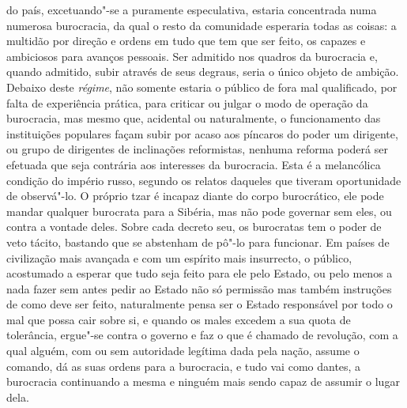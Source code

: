 do país, excetuando"-se a puramente especulativa, estaria concentrada
numa numerosa burocracia, da qual o resto da comunidade esperaria todas
as coisas: a multidão por direção e ordens em tudo que tem que ser
feito, os capazes e ambiciosos para avanços pessoais. Ser admitido nos
quadros da burocracia e, quando admitido, subir através de seus
degraus, seria o único objeto de ambição. Debaixo deste
\textit{régime}, não somente estaria o público de fora mal qualificado,
por falta de experiência prática, para criticar ou julgar o modo de
operação da burocracia, mas mesmo que, acidental ou naturalmente, o
funcionamento das instituições populares façam subir por acaso aos
píncaros do poder um dirigente, ou grupo de dirigentes de inclinações
reformistas, nenhuma reforma poderá ser efetuada que seja contrária aos
interesses da burocracia. Esta é a melancólica condição do império
russo, segundo os relatos daqueles que tiveram
oportunidade de observá"-lo. O próprio tzar é incapaz
diante do corpo burocrático, ele pode mandar qualquer burocrata para a
Sibéria, mas não pode governar sem eles, ou contra a vontade deles.
Sobre cada decreto seu, os burocratas tem o poder de veto tácito,
bastando que se abstenham de pô"-lo para funcionar. Em países de
civilização mais avançada e com um espírito mais insurrecto, o público,
acostumado a esperar que tudo seja feito para ele pelo Estado, ou pelo
menos a nada fazer sem antes pedir ao Estado não só permissão mas
também instruções de como deve ser feito, naturalmente pensa ser o
Estado responsável por todo o mal que possa cair sobre si, e quando os
males excedem a sua quota de tolerância, ergue"-se contra o governo e
faz o que é chamado de revolução, com a qual alguém, com ou sem
autoridade legítima dada pela nação, assume o comando, dá as suas
ordens para a burocracia, e tudo vai como dantes, a burocracia
continuando a mesma e ninguém mais sendo capaz de assumir o lugar dela.


